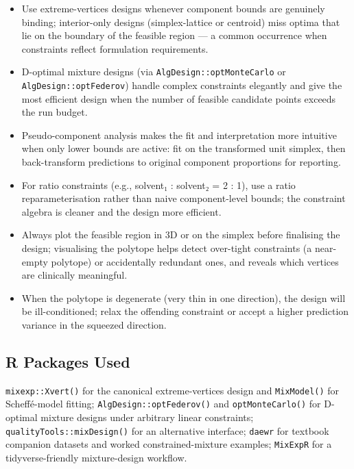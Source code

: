 \documentclass[
]{article}
\providecommand{\tightlist}{%
  \setlength{\itemsep}{0pt}\setlength{\parskip}{0pt}}
\begin{document}
\begin{itemize}
\tightlist
\item
  Use extreme-vertices designs whenever component bounds are genuinely
  binding; interior-only designs (simplex-lattice or centroid) miss
  optima that lie on the boundary of the feasible region --- a common
  occurrence when constraints reflect formulation requirements.
\item
  D-optimal mixture designs (via \texttt{AlgDesign::optMonteCarlo} or
  \texttt{AlgDesign::optFederov}) handle complex constraints elegantly
  and give the most efficient design when the number of feasible
  candidate points exceeds the run budget.
\item
  Pseudo-component analysis makes the fit and interpretation more
  intuitive when only lower bounds are active: fit on the transformed
  unit simplex, then back-transform predictions to original component
  proportions for reporting.
\item
  For ratio constraints (e.g., solvent₁ : solvent₂ = 2 : 1), use a ratio
  reparameterisation rather than naive component-level bounds; the
  constraint algebra is cleaner and the design more efficient.
\item
  Always plot the feasible region in 3D or on the simplex before
  finalising the design; visualising the polytope helps detect
  over-tight constraints (a near-empty polytope) or accidentally
  redundant ones, and reveals which vertices are clinically meaningful.
\item
  When the polytope is degenerate (very thin in one direction), the
  design will be ill-conditioned; relax the offending constraint or
  accept a higher prediction variance in the squeezed direction.
\end{itemize}

\subsection{R Packages Used}\label{r-packages-used}

\texttt{mixexp::Xvert()} for the canonical extreme-vertices design and
\texttt{MixModel()} for Scheffé-model fitting;
\texttt{AlgDesign::optFederov()} and \texttt{optMonteCarlo()} for
D-optimal mixture designs under arbitrary linear constraints;
\texttt{qualityTools::mixDesign()} for an alternative interface;
\texttt{daewr} for textbook companion datasets and worked
constrained-mixture examples; \texttt{MixExpR} for a tidyverse-friendly
mixture-design workflow.
\end{document}
